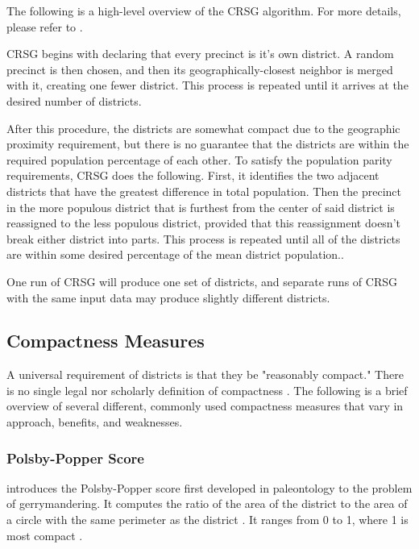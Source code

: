 The following is a high-level overview of the CRSG algorithm. For more details, please refer to \textcite[249-50]{chen2013}.

CRSG begins with declaring that every precinct is it's own district. A random precinct is then chosen, and then its geographically-closest neighbor is merged with it, creating one fewer district. This process is repeated until it arrives at the desired number of districts. \parencite[249-50]{chen2013}

After this procedure, the districts are somewhat compact due to the geographic proximity requirement, but there is no guarantee that the districts are within the required population percentage of each other. To satisfy the population parity requirements, CRSG does the following. First, it identifies the two adjacent districts that have the greatest difference in total population. Then the precinct in the more populous district that is furthest from the center of said district is reassigned to the less populous district, provided that this reassignment doesn't break either district into parts. This process is repeated until all of the districts are within some desired percentage of the mean district population.\textcite[249-50]{chen2013}.

One run of CRSG will produce one set of districts, and separate runs of CRSG with the same input data may produce slightly different districts.

\subsection{Compactness Measures}

A universal requirement of districts is that they be "reasonably compact." There is no single legal nor scholarly definition of compactness \parencite{katz2020}. The following is a brief overview of several different, commonly used compactness measures that vary in approach, benefits, and weaknesses.

\subsubsection{Polsby-Popper Score}
\label{sec:polsbypopper}

\textcite{polsby1991} introduces the Polsby-Popper score first developed in paleontology to the problem of gerrymandering. It computes the ratio of the area of the district to the area of a circle with the same perimeter as the district \parencite{cox1927,polsby1991}. It ranges from 0 to 1, where 1 is most compact \parencite{polsby1991}.

